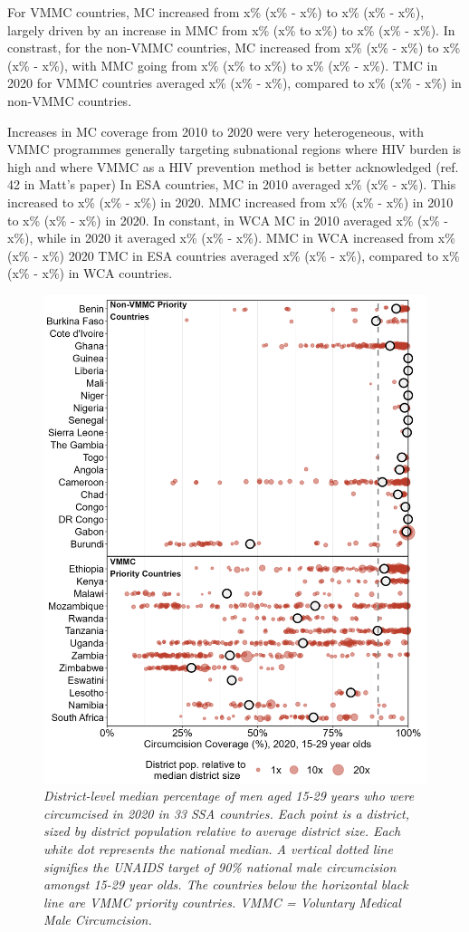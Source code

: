 \documentclass{article}
\begin{document}
For VMMC countries, MC increased from x\% (x\% - x\%) to x\% (x\% - x\%), largely driven by an increase in MMC from x\% (x\% to x\%)  to x\% (x\% - x\%). 
In constrast, for the non-VMMC countries, MC increased from x\% (x\% - x\%) to x\% (x\% - x\%), with MMC going from x\% (x\% to x\%)  to x\% (x\% - x\%). 
TMC in 2020 for VMMC countries averaged x\% (x\% - x\%), compared to x\% (x\% - x\%) in non-VMMC countries. 

Increases in MC coverage from 2010 to 2020 were very heterogeneous, with VMMC programmes generally targeting subnational regions where HIV burden is high and where VMMC as a HIV prevention method is better acknowledged (ref. 42 in Matt's paper)
In ESA countries, MC in 2010 averaged x\% (x\% - x\%). 
This increased to x\% (x\% - x\%) in 2020. MMC increased from x\% (x\% - x\%) in 2010 to x\% (x\% - x\%) in 2020. 
In constant, in WCA MC in 2010 averaged x\% (x\% - x\%), while in 2020 it averaged x\% (x\% - x\%).
MMC in WCA increased from x\% (x\% - x\%)
2020 TMC in ESA countries averaged x\% (x\% - x\%), compared to x\% (x\% - x\%) in WCA countries. 

\begin{figure}[H]
    \centering
    \includegraphics[width=.9\linewidth]
    {plots/03_subnat_plot.png}
    \caption{\emph{District-level median percentage of men aged 15-29 years who were circumcised in 2020 in 33 SSA countries.
    Each point is a district, sized by district population relative to average district size.
    Each white dot represents the national median. 
    A vertical dotted line signifies the UNAIDS target of 90\% national male circumcision amongst 15-29 year olds. The countries below the horizontal black line are VMMC priority countries. VMMC = Voluntary Medical Male Circumcision.}}
\end{figure}
\end{document}
